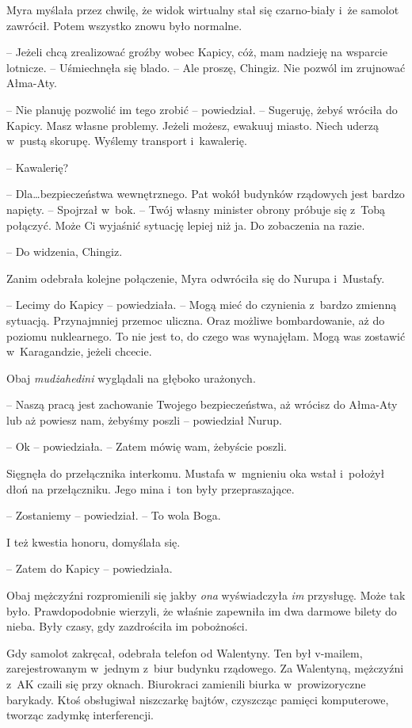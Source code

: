 \documentclass[oneside,polish,11pt,sfheadings]{mwbk}
\begin{document}
Myra myślała przez chwilę, że widok wirtualny stał się czarno-biały i~że
samolot zawrócił. Potem wszystko znowu było normalne.

-- Jeżeli chcą zrealizować groźby wobec Kapicy, cóż, mam nadzieję na
wsparcie lotnicze. -- Uśmiechnęła się blado. -- Ale proszę, Chingiz. Nie
pozwól im zrujnować Ałma-Aty.

-- Nie planuję pozwolić im tego zrobić -- powiedział. -- Sugeruję, żebyś
wróciła do Kapicy. Masz własne problemy. Jeżeli możesz, ewakuuj miasto.
Niech uderzą w~pustą skorupę. Wyślemy transport i~kawalerię.

-- Kawalerię?

-- Dla\ldots bezpieczeństwa wewnętrznego. Pat wokół budynków rządowych jest
bardzo napięty. -- Spojrzał w~bok. -- Twój własny minister obrony próbuje
się z~Tobą połączyć. Może Ci wyjaśnić sytuację lepiej niż ja. Do
zobaczenia na razie.

-- Do widzenia, Chingiz.

Zanim odebrała kolejne połączenie, Myra odwróciła się do Nurupa i~Mustafy.

-- Lecimy do Kapicy -- powiedziała. -- Mogą mieć do czynienia z~bardzo
zmienną sytuacją. Przynajmniej przemoc uliczna. Oraz możliwe
bombardowanie, aż do poziomu nuklearnego. To nie jest to, do czego was
wynajęłam. Mogą was zostawić w~Karagandzie, jeżeli chcecie.

Obaj \textit{mudżahedini} wyglądali na głęboko urażonych.

-- Naszą pracą jest zachowanie Twojego bezpieczeństwa, aż wrócisz do
Ałma-Aty lub aż powiesz nam, żebyśmy poszli -- powiedział Nurup.

-- Ok -- powiedziała. -- Zatem mówię wam, żebyście poszli.

Sięgnęła do przełącznika interkomu. Mustafa w~mgnieniu oka wstał i~położył dłoń na przełączniku. Jego mina i~ton były przepraszające. 

-- Zostaniemy -- powiedział. -- To wola Boga.

I też kwestia honoru, domyślała się.

-- Zatem do Kapicy -- powiedziała.

Obaj mężczyźni rozpromienili się jakby \textit{ona} wyświadczyła \textit{im}
przysługę. Może tak było. Prawdopodobnie wierzyli, że właśnie zapewniła
im dwa darmowe bilety do nieba. Były czasy, gdy zazdrościła im
pobożności.

Gdy samolot zakręcał, odebrała telefon od Walentyny. Ten był v-mailem,
zarejestrowanym w~jednym z~biur budynku rządowego. Za Walentyną,
mężczyźni z~AK czaili się przy oknach. Biurokraci zamienili biurka w~prowizoryczne barykady. Ktoś obsługiwał niszczarkę bajtów, czyszcząc
pamięci komputerowe, tworząc zadymkę interferencji.
\end{document}
